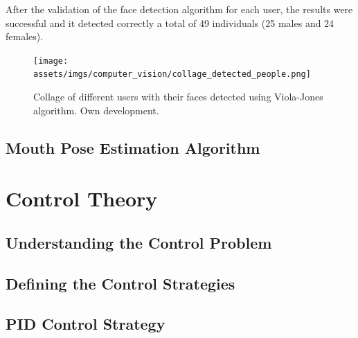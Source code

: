 \documentclass[11pt]{report} %
\begin{document}
After the validation of the face detection algorithm for each user, the results were successful and it detected correctly a total of 49 individuals (25 males and 24 females).\\

\begin{figure}[H]
    \centering
    \texttt{[image: assets/imgs/computer\_vision/collage\_detected\_people.png]}
    \caption{Collage of different users with their faces detected using Viola-Jones algorithm. Own development.} 
    \label{fig_collage_people_detected}
\end{figure}




































\section{Mouth Pose Estimation Algorithm}









\chapter{Control Theory}

\section{Understanding the Control Problem}

\section{Defining the Control Strategies}

\section{PID Control Strategy}
\end{document}
